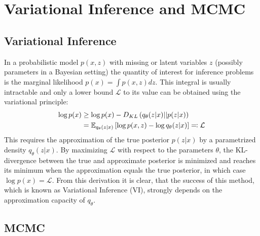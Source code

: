 \section{Variational Inference and MCMC}
\label{sec:VIandMCMC}
\subsection{Variational Inference}

In a probabilistic model $p(x, z)$ with missing or latent variables $z$ (possibly parameters in a Bayesian setting) the quantity of interest for inference problems is the marginal likelihood $p(x) = \int p(x, z) dz$. This integral is usually intractable and only a lower bound $\mathcal{L}$ to its value can be obtained using the variational principle:
\begin{equation}
\begin{split}
\log p(x) &\geq \log p(x) - D_{KL} \left( q_{\theta}(z|x) || p(z|x) \right) \\
			   &=  \mathbb{E}_{q_{\theta}(z|x)} \left[ \log p(x, z) - \log q_\theta(z|x) \right] \eqqcolon \mathcal{L}
\end{split}
\end{equation}
This requires the approximation of the true posterior $p(z|x)$ by a parametrized density $q_{\theta}(z|x)$. By maximizing $\mathcal{L}$ with respect to the parameters $\theta$, the KL-divergence between the true and approximate posterior is minimized and reaches its minimum when the approximation equals the true posterior, in which case $\log p(x) = \mathcal{L}$. From this derivation it is clear, that the success of this method, which is known as Variational Inference (VI), strongly depends on the approximation capacity of $q_\theta$.

\subsection{MCMC}
\label{sec:MCMC}


